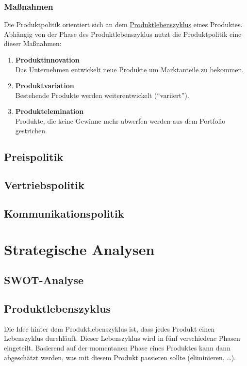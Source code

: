 \subsubsection{Maßnahmen}
\begin{flushleft}
    Die Produktpolitik orientiert sich an dem \hyperref[subsec:Produktlebenszyklus]{Produktlebenszyklus}
    eines Produktes. Abhängig von der Phase des Produktlebenszyklus nutzt die Produktpolitik eine dieser
    Maßnahmen:
    \begin{enumerate}
        \item {
            \textbf{Produktinnovation} \\
            Das Unternehmen entwickelt neue Produkte um Marktanteile zu bekommen.
        }
        \item {
            \textbf{Produktvariation} \\
            Bestehende Produkte werden weiterentwickelt (``variiert'').
        }
        \item {
            \textbf{Produktelemination} \\
            Produkte, die keine Gewinne mehr abwerfen werden aus dem Portfolio gestrichen.
        }
    \end{enumerate}
\end{flushleft}

\subsection{Preispolitik}
\subsection{Vertriebspolitik}
\subsection{Kommunikationspolitik}

\section{Strategische Analysen}
\subsection{SWOT-Analyse}
\subsection{Produktlebenszyklus}\label{subsec:Produktlebenszyklus}
\begin{flushleft}
    Die Idee hinter dem Produktlebenszyklus ist, dass jedes Produkt einen Lebenszyklus durchläuft.
    Dieser Lebenszyklus wird in fünf verschiedene Phasen eingeteilt.
    Basierend auf der momentanen Phase eines Produktes kann dann abgeschätzt werden, was
    mit diesem Produkt passieren sollte (eliminieren, \dots).
\end{flushleft}


